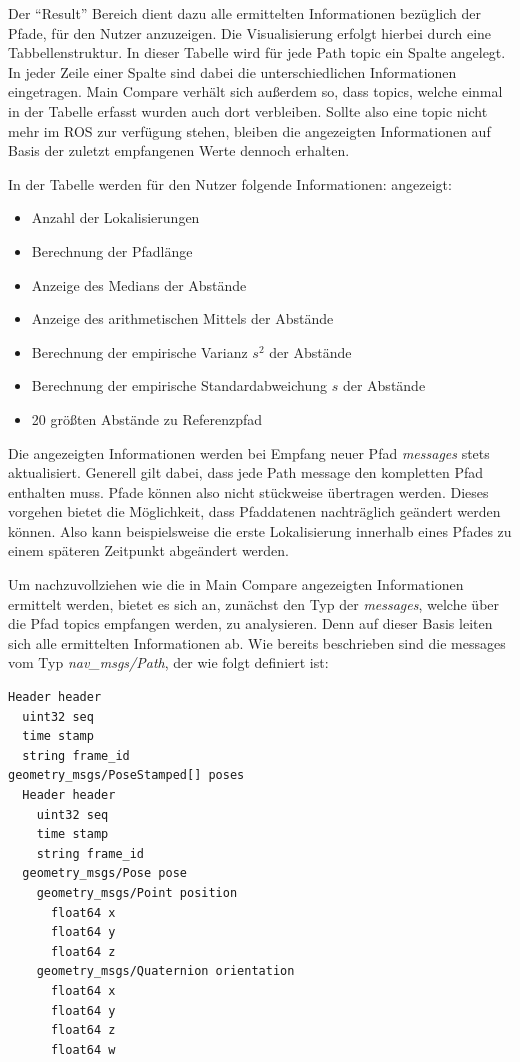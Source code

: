 Der ``Result'' Bereich dient dazu alle ermittelten Informationen bezüglich der
Pfade, für den Nutzer anzuzeigen. Die Visualisierung erfolgt hierbei durch eine
Tabbellenstruktur. In dieser Tabelle wird für jede Path topic ein Spalte
angelegt.
In jeder Zeile einer Spalte sind dabei die unterschiedlichen
Informationen eingetragen.
Main Compare verhält sich außerdem so, dass topics, welche einmal in
der Tabelle erfasst wurden auch dort verbleiben. Sollte also eine topic nicht
mehr im ROS zur verfügung stehen, bleiben die angezeigten Informationen auf
Basis der zuletzt empfangenen Werte dennoch erhalten. 

In der Tabelle werden für den Nutzer folgende Informationen:
angezeigt:

\begin{itemize}
  \item Anzahl der Lokalisierungen
  \item Berechnung der Pfadlänge
  \item Anzeige des Medians der Abstände
  \item Anzeige des arithmetischen Mittels der Abstände
  \item Berechnung der empirische Varianz $s^2$ der Abstände
  \item Berechnung der empirische Standardabweichung $s$ der Abstände
  \item 20 größten Abstände zu Referenzpfad
\end{itemize}

Die angezeigten Informationen werden bei Empfang neuer Pfad \textit{messages} stets
aktualisiert. Generell gilt dabei, dass jede Path message den kompletten Pfad
enthalten muss. Pfade können also nicht stückweise übertragen werden. Dieses vorgehen
bietet die Möglichkeit, dass Pfaddatenen nachträglich geändert werden können.
Also kann beispielsweise die erste Lokalisierung innerhalb eines Pfades zu einem
späteren Zeitpunkt abgeändert werden. 

Um nachzuvollziehen wie die in Main Compare angezeigten Informationen ermittelt werden, bietet
es sich an, zunächst den Typ der \textit{messages}, welche über die Pfad topics
empfangen werden, zu analysieren. Denn auf dieser Basis leiten sich alle
ermittelten Informationen ab. Wie bereits beschrieben sind die messages vom Typ
\textit{nav\_msgs/Path}, der wie folgt definiert ist:

\begin{lstlisting}[caption=ROS transformation message, label=lst:pathmsgs]
Header header
  uint32 seq
  time stamp
  string frame_id
geometry_msgs/PoseStamped[] poses
  Header header
    uint32 seq
    time stamp
    string frame_id
  geometry_msgs/Pose pose
    geometry_msgs/Point position
      float64 x
      float64 y
      float64 z
    geometry_msgs/Quaternion orientation
      float64 x
      float64 y
      float64 z
      float64 w
\end{lstlisting}

